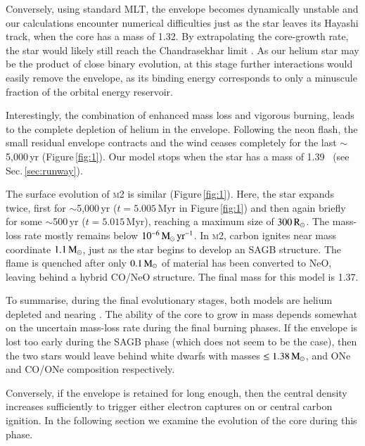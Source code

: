 \documentclass{aa}
\begin{document}
Conversely, using standard MLT, the envelope becomes dynamically unstable and our calculations encounter numerical difficulties just as the star leaves its Hayashi track, when the core has a mass of 1.32\msun.
By extrapolating the core-growth rate, the star would likely still reach the  Chandrasekhar limit \citep[see ][for a similar conclusion]{Woosley:2019sdf}. 
As our helium star may be the product of close binary evolution, at this stage further interactions would easily remove the envelope, as its binding energy corresponds to only a minuscule fraction of the orbital energy reservoir. 

Interestingly, the combination of enhanced mass loss and vigorous burning, leads to the complete depletion of helium in the envelope. 
Following the neon flash, the small residual envelope contracts and the wind ceases completely for the last $\sim$5,000\,yr (Figure\,\ref{fig:1}). Our model stops when the star has a mass of 1.39\msun~ (see Sec.\,\ref{sec:runway}).  

The surface evolution of \textsc{m2} is similar (Figure\,\ref{fig:1}). Here, 
the star expands twice, first for $\sim$5,000\,yr ($t=5.005$\,Myr in Figure\,\ref{fig:1}) and then again  briefly for some 
$\sim$500\,yr ($t=5.015$\,Myr), reaching a maximum size of $300\mathrm{\,R_\odot}$. The mass-loss rate mostly remains 
below $10^{-6}\mathrm{\,M_{\odot}\,yr^{-1}}$. In \textsc{m2}, carbon ignites near mass coordinate $1.1\mathrm{\,M_\odot}$, 
just as the star begins to develop an SAGB structure. The flame is quenched after only 
$0.1\mathrm{\,M_\odot}$ of material has been converted to NeO, leaving behind a hybrid CO/NeO structure. The final mass for this model is 1.37\msun. 

To summarise, during the final evolutionary stages, both models are helium 
depleted and nearing \mch. The ability of the core 
to grow in mass depends somewhat on the uncertain mass-loss rate during the final burning phases. If the envelope 
is lost too early during the SAGB phase (which does not seem to be the case), then the two stars would 
leave behind white dwarfs with masses $\le 1.38\mathrm{\,M_\odot}$, and ONe and CO/ONe composition respectively. 

Conversely, if the envelope is retained for long enough, then the central density increases sufficiently to trigger either electron captures on  or central carbon ignition. 
In the following section we examine the evolution of the core during this phase. 
\end{document}
